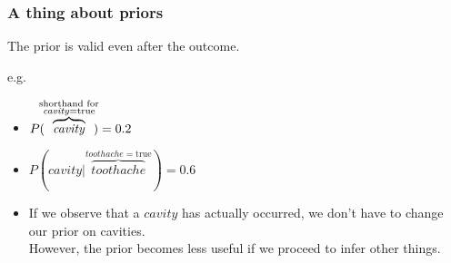 \begin{frame}\frametitle{A thing about priors}

The prior is valid even after the outcome.

e.g.\\
\begin{itemize}
 \item[] $P( \kern-1ex \overbrace{\mathit{cavity}}^{\substack{\text{shorthand for}\\{\mathit{cavity}}=\text{true}}} \kern-1ex) = 0.2$
 \item[] $P(\mathit{cavity} | \overbrace{\mathit{toothache}}^{{\mathit{toothache}}=\text{true}}) = 0.6$
 \item[] If we observe that a $\mathit{cavity}$ has actually occurred, we don't have to change our prior on cavities.\\
 However, the prior becomes less useful if we proceed to infer other things.
\end{itemize}



\end{frame}

